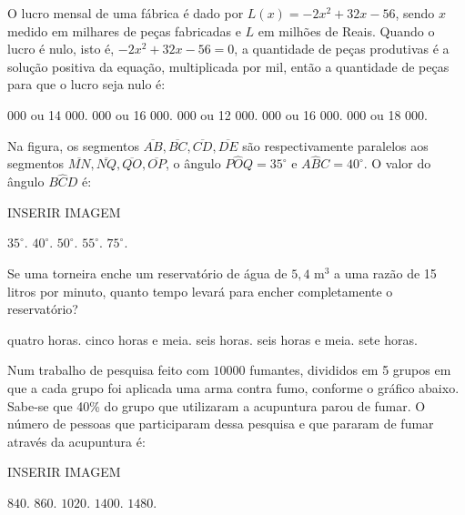 \begin{question}%
O lucro mensal de uma fábrica é dado por \(L(x) = -2x^2 + 32x - 56\), sendo \(x\) medido em milhares de peças fabricadas e \(L\) em milhões de Reais. Quando o lucro é nulo, isto é, \(-2x^2 + 32x - 56 = 0\), a quantidade de peças produtivas é a solução positiva da equação, multiplicada por mil, então a quantidade de peças para que o lucro seja nulo é:
    \begin{tasks}
         000 ou 14 000.
         000 ou 16 000.
         000 ou 12 000.
         000 ou 16 000.
         000 ou 18 000.
    \end{tasks}
\end{question}

\begin{question}%
Na figura, os segmentos \(\overline{AB}, \overline{BC}, \overline{CD}, \overline{DE}\) são respectivamente paralelos aos segmentos \(\overline{MN}, \overline{NQ}, \overline{QO}, \overline{OP}\), o ângulo \(P\hat{O}Q = 35^\circ\) e \(A\hat{B}C = 40^\circ\). O valor do ângulo \(B\hat{C}D\) é:

INSERIR IMAGEM
    \begin{tasks}
        \task \(35^\circ\).
        \task \(40^\circ\).
        \task \(50^\circ\).
        \task \(55^\circ\).
        \task \(75^\circ\).
    \end{tasks}
\end{question}

\begin{question}%
Se uma torneira enche um reservatório de água de \(5,4\) m\(^3\) a uma razão de 15 litros por minuto, quanto tempo levará para encher completamente o reservatório?
    \begin{tasks}
        \task quatro horas.
        \task cinco horas e meia.
        \task seis horas.
        \task seis horas e meia.
        \task sete horas.
    \end{tasks}
\end{question}

\begin{question}%
Num trabalho de pesquisa feito com \(10 000\) fumantes, divididos em 5 grupos em que a cada grupo foi aplicada uma arma contra fumo, conforme o gráfico abaixo. Sabe-se que 40\% do grupo que utilizaram a acupuntura parou de fumar. O número de pessoas que participaram dessa pesquisa e que pararam de fumar através da acupuntura é:

INSERIR IMAGEM
    \begin{tasks}
        \task \(840\).
        \task \(860\).
        \task \(1020\).
        \task \(1400\).
        \task \(1480\).
    \end{tasks}
\end{question}

